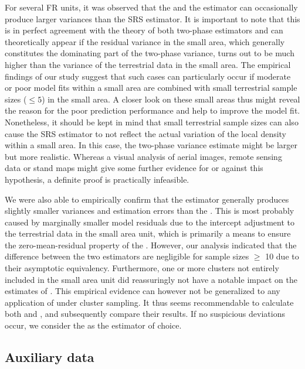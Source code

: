 For several FR units, it was observed that the \psmall{} and the \extpsynth{} estimator can occasionally produce larger variances than the SRS estimator. It is important to note that this is in perfect agreement with the theory of both two-phase estimators and can theoretically appear if the residual variance in the small area, which generally constitutes the dominating part of the two-phase variance, turns out to be much higher than the variance of the terrestrial data in the small area. The empirical findings of our study suggest that such cases can particularly occur if moderate or poor model fits within a small area are combined with small terrestrial sample sizes ($\leq 5$) in the small area. A closer look on these small areas thus might reveal the reason for the poor prediction performance and help to improve the model fit. Nonetheless, it should be kept in mind that small terrestrial sample sizes can also cause the SRS estimator to not reflect the actual variation of the local density within a small area. In this case, the two-phase variance estimate might be larger but more realistic. Whereas a visual analysis of aerial images, remote sensing data or stand maps might give some further evidence for or against this hypothesis, a definite proof is practically infeasible.\par

We were also able to empirically confirm that the \extpsynth{} estimator generally produces slightly smaller variances and estimation errors than the \psmall{}. This is most probably caused by marginally smaller model residuals due to the intercept adjustment to the terrestrial data in the small area unit, which is primarily a means to ensure the zero-mean-residual property of the \extpsynth{}. However, our analysis indicated that the difference between the two estimators are negligible for sample sizes $\geq$ 10 due to their asymptotic equivalency. Furthermore, one or more clusters not entirely included in the small area unit did reassuringly not have a notable impact on the estimates of \extpsynth{}. This empirical evidence can however not be generalized to any application of \extpsynth{} under cluster sampling. It thus seems recommendable to calculate both \psmall{} and \extpsynth{}, and subsequently compare their results. If no suspicious deviations occur, we consider the \extpsynth{} as the estimator of choice.\par

\subsection{Auxiliary data}

